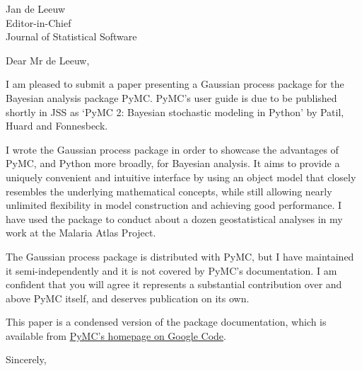 \documentclass{letter}
\begin{document}

\begin{letter}{Jan de Leeuw \\ Editor-in-Chief \\ Journal of Statistical Software}
\opening{Dear Mr de Leeuw,}

I am pleased to submit a paper presenting a Gaussian process package for the Bayesian analysis package PyMC. PyMC's user guide is due to be published shortly in JSS as `PyMC 2: Bayesian stochastic modeling in Python' by Patil, Huard and Fonnesbeck.

I wrote the Gaussian process package in order to showcase the advantages of PyMC, and Python more broadly, for Bayesian analysis. It aims to provide a uniquely convenient and intuitive interface by using an object model that closely resembles the underlying mathematical concepts, while still allowing nearly unlimited flexibility in model construction and achieving good performance. I have used the package to conduct about a dozen geostatistical analyses in my work at the Malaria Atlas Project.

The Gaussian process package is distributed with PyMC, but I have maintained it semi-independently and it is not covered by PyMC's documentation. I am confident that you will agree it represents a substantial contribution over and above PyMC itself, and deserves publication on its own.

This paper is a condensed version of the package documentation, which is available from \href{http://pymc.googlecode.com/files/GPUserGuide.pdf}{PyMC's homepage on Google Code}.

\closing{Sincerely,}

\end{letter}
\end{document}
